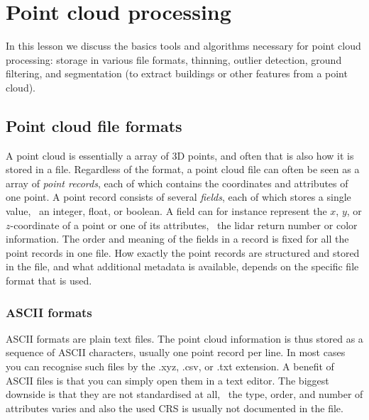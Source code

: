 
\graphicspath{{pcprocessing/}}
\label{chap:pcprocessing}

\chapter{Point cloud processing}

In this lesson we discuss the basics tools and algorithms necessary for point cloud processing: storage in various file formats, thinning, outlier detection, ground filtering, and segmentation (to extract buildings or other features from a point cloud).



%
\section{Point cloud file formats}
A point cloud is essentially a array of 3D points, and often that is also how it is stored in a file.
Regardless of the format, a point cloud file can often be seen as a array of \emph{point records}, each of which contains the coordinates and attributes of one point.
A point record consists of several \emph{fields}, each of which stores a single value, \eg\ an integer, float, or boolean.
A field can for instance represent the $x$, $y$, or $z$-coordinate of a point or one of its attributes, \eg\ the lidar return number or color information.
The order and meaning of the fields in a record is fixed for all the point records in one file.
How exactly the point records are structured and stored in the file, and what additional metadata is available, depends on the specific file format that is used.



\subsection{ASCII formats}
ASCII formats are plain text files. 
The point cloud information is thus stored as a sequence of ASCII characters, usually one point record per line.
In most cases you can recognise such files by the .xyz, .csv, or .txt extension.
A benefit of ASCII files is that you can simply open them in a text editor.
The biggest downside is that they are not standardised at all, \ie\ the type, order, and number of attributes varies and also the used CRS is usually not documented in the file.

